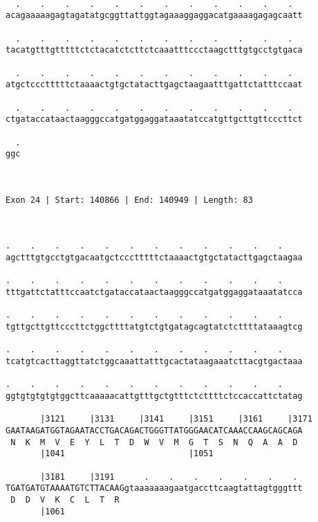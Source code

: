 \documentclass{article}
\begin{document}
\begin{Verbatim}
  
  .    .    .    .    .    .    .    .    .    .    .    .  
acagaaaaagagtagatatgcggttattggtagaaaggaggacatgaaaagagagcaatt
                                                            
  .    .    .    .    .    .    .    .    .    .    .    .  
tacatgtttgtttttctctacatctcttctcaaatttccctaagctttgtgcctgtgaca
                                                            
  .    .    .    .    .    .    .    .    .    .    .    .  
atgctccctttttctaaaactgtgctatacttgagctaagaatttgattctatttccaat
                                                            
  .    .    .    .    .    .    .    .    .    .    .    .  
ctgataccataactaagggccatgatggaggataaatatccatgttgcttgttcccttct
                                                            
  .
ggc
   
   
 
Exon 24 | Start: 140866 | End: 140949 | Length: 83



.    .    .    .    .    .    .    .    .    .    .    .    
agctttgtgcctgtgacaatgctccctttttctaaaactgtgctatacttgagctaagaa
                                                            
.    .    .    .    .    .    .    .    .    .    .    .    
tttgattctatttccaatctgataccataactaagggccatgatggaggataaatatcca
                                                            
.    .    .    .    .    .    .    .    .    .    .    .    
tgttgcttgttcccttctggcttttatgtctgtgatagcagtatctcttttataaagtcg
                                                            
.    .    .    .    .    .    .    .    .    .    .    .    
tcatgtcacttaggttatctggcaaattatttgcactataagaaatcttacgtgactaaa
                                                            
.    .    .    .    .    .    .    .    .    .    .    .    
ggtgtgtgtgtggcttcaaaaacattgtttgctgtttctcttttctccaccattctatag
                                                            
       |3121     |3131     |3141     |3151     |3161     |3171
GAATAAGATGGTAGAATACCTGACAGACTGGGTTATGGGAACATCAAACCAAGCAGCAGA
 N  K  M  V  E  Y  L  T  D  W  V  M  G  T  S  N  Q  A  A  D 
       |1041                         |1051                  
  
       |3181     |3191      .    .    .    .    .    .    . 
TGATGATGTAAAATGTCTTACAAGgtaaaaaaagaatgaccttcaagtattagtgggttt
 D  D  V  K  C  L  T  R                                     
       |1061                                                
  

\end{Verbatim}
\end{document}
